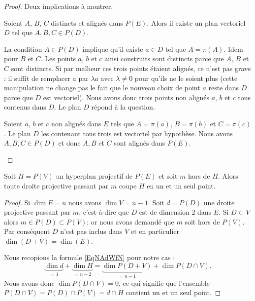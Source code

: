 \begin{proof}
	Deux implications à montrer.
	\begin{subproof}
		Soient \( A\), \( B\), \( C\) distincts et alignés dans \( P(E)\). Alors il existe un plan vectoriel \( D\) tel que \( A,B,C\in P(D)\).

		La condition \( A\in P(D)\) implique qu'il existe \( a\in D\) tel que \( A=\pi(A)\). Idem pour \( B\) et \( C\). Les points \( a\), \( b\) et \( c\) ainsi construits sont distincts parce que \( A\), \( B\) et \( C\) sont distincts. Si par malheur ces trois points étaient alignés, ce n'est pas grave : il suffit de remplacer \( a\) par \( \lambda a\) avec \( \lambda\neq 0\) pour qu'ils ne le soient plus (cette manipulation ne change pas le fait que le nouveau choix de point \( a\) reste dans \( D\) parce que \( D\) est vectoriel). Nous avons donc trois points non alignés \( a\), \( b\) et \( c\) tous contenus dans \( D\). Le plan \( D\) répond à la question.


		Soient \( a\), \( b\) et \( c\) non alignés dans \( E\) tels que \( A=\pi(a)\), \( B=\pi(b)\) et \( C=\pi(c)\). Le plan \( D\) les contenant tous trois est vectoriel par hypothèse. Nous avons \( A,B,C\in P(D)\) et donc \( A,B\) et \( C\) sont alignés dans \( P(E)\).
	\end{subproof}
\end{proof}

\begin{proposition}
	Soit \( H=P(V)\) un hyperplan projectif de \( P(E)\) et soit \( m\) hors de \( H\). Alors toute droite projective passant par \( m\) coupe \( H\) en un et un seul point.
\end{proposition}

\begin{proof}
	Si \( \dim E=n\) nous avons \( \dim V=n-1\). Soit \( d=P(D)\) une droite projective passant par \( m\), c'est-à-dire que \( D\) est de dimension \( 2\) dans \( E\). Si \( D\subset V\) alors \( m\in P(D)\subset P(V)\); or nous avons demandé que \( m\) soit hors de \( P(V)\). Par conséquent \( D\) n'est pas inclus dans \( V\) et en particulier \( \dim(D+V)=\dim(E)\).

	Nous recopions la formule \eqref{EqNAdWfN} pour notre cas :
	\begin{equation}
		\underbrace{\dim d}_{=1}+\underbrace{\dim H}_{=n-2}=\underbrace{\dim P(D+V)}_{=n-1}+\dim P(D\cap V).
	\end{equation}
	Nous avons donc \( \dim P(D\cap V)=0\), ce qui signifie que l'ensemble \( P(D\cap V)=P(D)\cap P(V)=d\cap H\) contient un et un seul point.
\end{proof}

